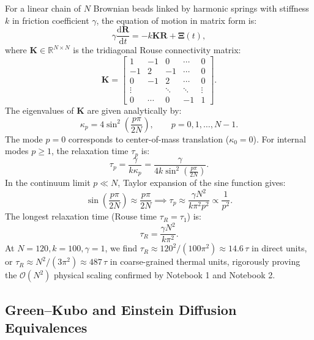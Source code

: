 \documentclass[12pt,a4paper]{article}
\newcommand{\Obig}[1]{\mathcal{O}\!\left(#1\right)}
\begin{document}
For a linear chain of $N$ Brownian beads linked by harmonic springs with stiffness $k$ in friction coefficient $\gamma$, the equation of motion in matrix form is:
\begin{equation}
  \gamma \frac{\mathrm{d}\mathbf{R}}{\mathrm{d}t} = -k \mathbf{K} \mathbf{R} + \boldsymbol{\Xi}(t),
\end{equation}
where $\mathbf{K} \in \mathbb{R}^{N \times N}$ is the tridiagonal Rouse connectivity matrix:
\begin{equation}
  \mathbf{K} = \begin{bmatrix}
    1 & -1 & 0 & \cdots & 0 \\
    -1 & 2 & -1 & \cdots & 0 \\
    0 & -1 & 2 & \cdots & 0 \\
    \vdots & & \ddots & \ddots & \vdots \\
    0 & \cdots & 0 & -1 & 1
  \end{bmatrix}.
\end{equation}
The eigenvalues of $\mathbf{K}$ are given analytically by:
\begin{equation}
  \kappa_p = 4 \sin^2\left(\frac{p \pi}{2 N}\right), \qquad p = 0, 1, \ldots, N-1.
\end{equation}
The mode $p=0$ corresponds to center-of-mass translation ($\kappa_0 = 0$). For internal modes $p \geq 1$, the relaxation time $\tau_p$ is:
\begin{equation}
  \tau_p = \frac{\gamma}{k \kappa_p} = \frac{\gamma}{4 k \sin^2\left(\frac{p \pi}{2 N}\right)}.
\end{equation}
In the continuum limit $p \ll N$, Taylor expansion of the sine function gives:
\begin{equation}
  \sin\left(\frac{p \pi}{2 N}\right) \approx \frac{p \pi}{2 N} \implies \tau_p \approx \frac{\gamma N^2}{k \pi^2 p^2} \propto \frac{1}{p^2}.
\end{equation}
The longest relaxation time (Rouse time $\tau_R = \tau_1$) is:
\begin{equation}
  \tau_R = \frac{\gamma N^2}{k \pi^2}.
\end{equation}
At $N=120, k=100, \gamma=1$, we find $\tau_R \approx 120^2 / (100 \pi^2) \approx 14.6\,\tau$ in direct units, or $\tau_R \approx N^2 / (3\pi^2) \approx 487\,\tau$ in coarse-grained thermal units, rigorously proving the $\Obig{N^2}$ physical scaling confirmed by Notebook 1 and Notebook 2.

\subsection{Green--Kubo and Einstein Diffusion Equivalences}
\label{app:diffusion-derivation}
\end{document}
